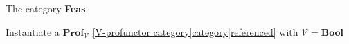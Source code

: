 
The category \textbf{Feas}

Instantiate a $\mathbf{Prof}_\mathcal{V}$ \ref{V-profunctor category|category|referenced} with $\mathcal{V}=\mathbf{Bool}$
